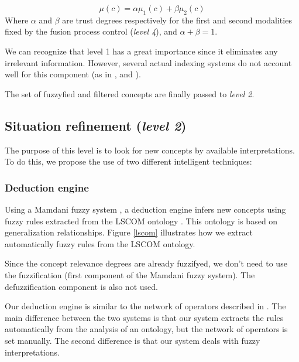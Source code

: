 		\begin{equation}
			\label{equation3}
			\mu(c) = \alpha \mu_{1}(c)  + \beta \mu_{2}(c)
		\end{equation}
		Where $\alpha$ and $\beta$ are trust degrees respectively for the first and second modalities fixed by 
		the fusion process control (\emph{level 4}), and $\alpha + \beta = 1$.

		We can recognize that level 1 has a great importance since it eliminates any irrelevant information. 
		However, several actual indexing systems do not account well for this component (as in \citep{Vrochidis2010},
		\citep{Snoek2006} and \citep{Ayache2007}).

		The set of fuzzyfied and filtered concepts are finally passed to \emph{level 2}.

	\subsection{Situation refinement (\emph{level 2})}
		The purpose of this level is to look for new concepts by  available interpretations.
		To do this, we propose the use of two different intelligent techniques:

		\subsubsection{Deduction engine}
		Using a Mamdani fuzzy system \citep{Mamdani1975},
		 a deduction engine infers new concepts using fuzzy rules extracted from the LSCOM ontology \citep{Kennedy2006}. 
		This ontology is based on generalization relationships. Figure \ref{lscom} illustrates how we extract automatically
		fuzzy rules from the LSCOM ontology.

		Since the concept relevance degrees are already fuzzifyed, we don't need to use the fuzzification 
		(first component of the Mamdani fuzzy system).
		The defuzzification component is also not used.
		
		Our deduction engine is similar to the network of operators described in \citep{Ayache2007}. 
		The main difference between the two systems is that our system extracts the rules automatically 
		from the analysis of an ontology, but the network of operators is set manually. 
		The second difference is that our system deals with fuzzy interpretations.

